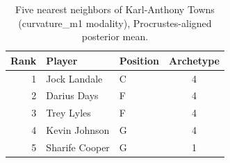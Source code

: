\begin{table}[htbp]
  \centering\small
  \begin{tabular}{rllc}
    \toprule
    Rank & Player & Position & Archetype \\
    \midrule
    1 & Jock Landale & C & 4 \\
    2 & Darius Days & F & 4 \\
    3 & Trey Lyles & F & 4 \\
    4 & Kevin Johnson & G & 4 \\
    5 & Sharife Cooper & G & 1 \\
    \bottomrule
  \end{tabular}
  \caption{Five nearest neighbors of Karl-Anthony Towns (curvature_m1 modality), Procrustes-aligned posterior mean.}
  \label{tab:Karl_Anthony_Towns_neighbors_curvature_m1}
\end{table}

